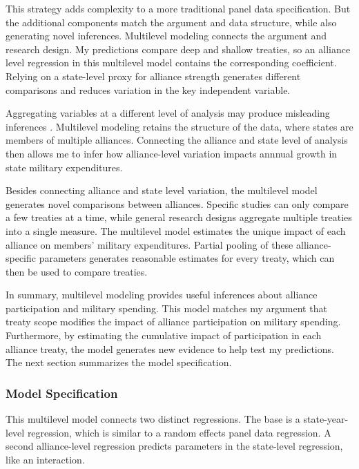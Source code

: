 \documentclass[12pt]{article}
\begin{document}
This strategy adds complexity to a more traditional panel data specification. 
But the additional components match the argument and data structure, while also generating novel inferences. 
Multilevel modeling connects the argument and research design. 
My predictions compare deep and shallow treaties, so an alliance level regression in this multilevel model contains the corresponding coefficient.
Relying on a state-level proxy for alliance strength generates different comparisons and reduces variation in the key independent variable.


Aggregating variables at a different level of analysis may produce misleading inferences \citep{McElreath2016}. 
Multilevel modeling retains the structure of the data, where states are members of multiple alliances. 
Connecting the alliance and state level of analysis then allows me to infer how alliance-level variation impacts annnual growth in state military expenditures. 


Besides connecting alliance and state level variation, the multilevel model generates novel comparisons between alliances. 
Specific studies can only compare a few treaties at a time, while general research designs aggregate multiple treaties into a single measure. 
The multilevel model estimates the unique impact of each alliance on members' military expenditures. 
Partial pooling of these alliance-specific parameters generates reasonable estimates for every treaty, which can then be used to compare treaties. 


In summary, multilevel modeling provides useful inferences about alliance participation and military spending. 
This model matches my argument that treaty scope modifies the impact of alliance participation on military spending. 
Furthermore, by estimating the cumulative impact of participation in each alliance treaty, the model generates new evidence to help test my predictions. 
The next section summarizes the model specification. 
 


\subsubsection{Model Specification} 

This multilevel model connects two distinct regressions. 
The base is a state-year-level regression, which is similar to a random effects panel data regression.
A second alliance-level regression predicts parameters in the state-level regression, like an interaction. 
\end{document}
